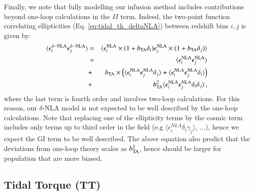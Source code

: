 \documentclass[useAMS,usenatbib]{mn2e}
\begin{document}
Finally, we note that fully modelling our infusion method includes contributions beyond one-loop calculations in the $II$ term. Indeed, the two-point function correlating ellipticities (Eq. \ref{eq:tidal_th_deltaNLA}) between redshift bins $i,j$ is given by:
 \begin{eqnarray}
\langle \epsilon_{i}^{\delta-\rm NLA} \epsilon_{j}^{\delta-\rm NLA}\rangle &=& \langle \epsilon_{i}^{\rm NLA}\times(1 + b_{\rm TA}\delta_i) \epsilon_{j}^{\rm NLA}\times(1 + b_{\rm TA}\delta_j)\rangle\\
&=& \langle \epsilon_{i}^{\rm NLA}  \epsilon_{j}^{\rm NLA}\rangle \nonumber \\
&+& b_{\rm TA} \times \left(\langle \epsilon_{i}^{\rm NLA}  \epsilon_{j}^{\rm NLA}\delta_j  \rangle + \langle \epsilon_{i}^{\rm NLA}  \epsilon_{j}^{\rm NLA}\delta_i  \rangle \right)\nonumber\\
&+& b_{\rm TA}^2 \langle \epsilon_{i}^{\rm NLA}  \epsilon_{j}^{\rm NLA}\delta_i  \delta_j \rangle \, ,
\label{eq:2pcf_deltaNLA}
\end{eqnarray}
where the last term is fourth order and involves two-loop calculations. For this reason, our $\delta$-NLA model is not expected to be well described by the one-loop calculations. Note that replacing one of the ellipticity terms by the cosmic term includes only terms up to third order in the field (e.g $\langle \epsilon_{i}^{NLA}\delta_i \gamma_j \rangle$, ...), hence  we expect the GI term to be well described. The above equation also predict that the deviations from one-loop theory scales as $b_{\rm TA}^2$, hence should be larger for population that are more biased.

\subsection{Tidal Torque (TT)}
\label{subsec:IA_th_TT}
\end{document}

